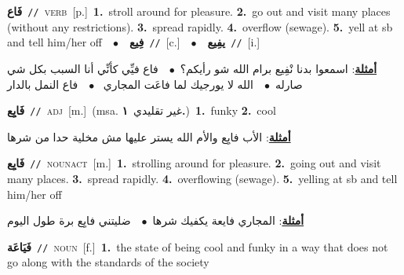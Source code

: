 \documentclass[10pt,a4paper,twoside]{article} %
\begin{document}
\begin{multicols}{2}
{\setlength\topsep{0pt}\textbf{\foreignlanguage{arabic}{فَاع}}\ {\color{gray}\texttt{//}\color{black}}\ \textsc{verb}\ [p.]\ \textbf{1.}~stroll around for pleasure.  \textbf{2.}~go out and visit many places (without any restrictions).  \textbf{3.}~spread rapidly.  \textbf{4.}~overflow (sewage).  \textbf{5.}~yell at sb and tell him/her off\ \ $\bullet$\ \ \setlength\topsep{0pt}\textbf{\foreignlanguage{arabic}{فِيع}}\ {\color{gray}\texttt{//}\color{black}}\ [c.]\ \ $\bullet$\ \ \setlength\topsep{0pt}\textbf{\foreignlanguage{arabic}{يفِيع}}\ {\color{gray}\texttt{//}\color{black}}\ [i.]\  \begin{flushright}\color{gray}\foreignlanguage{arabic}{\textbf{\underline{\foreignlanguage{arabic}{أمثلة}}}: اسمعوا بدنا نْفِيع برام الله شو رأيكم؟\ $\bullet$\ \  فاع فيِّي كأنِّي أنا السبب بكل شي صارله\ $\bullet$\ \  الله لا يورجيك لما فاعَت المجاري \ $\bullet$\ \  فاع النمل بالدار}\end{flushright}\color{black}} \vspace{2mm}

{\setlength\topsep{0pt}\textbf{\foreignlanguage{arabic}{فَايِع}}\ {\color{gray}\texttt{//}\color{black}}\ \textsc{adj}\ [m.]\ \color{gray}(msa. \foreignlanguage{arabic}{غير تقليدي}~\foreignlanguage{arabic}{\textbf{١.}})\color{black}\ \textbf{1.}~funky  \textbf{2.}~cool\  \begin{flushright}\color{gray}\foreignlanguage{arabic}{\textbf{\underline{\foreignlanguage{arabic}{أمثلة}}}: الأب فايِع والأم الله يستر عليها مش مخلية حدا من شرها}\end{flushright}\color{black}} \vspace{2mm}

{\setlength\topsep{0pt}\textbf{\foreignlanguage{arabic}{فَايِع}}\ {\color{gray}\texttt{//}\color{black}}\ \textsc{noun\textunderscore act}\ [m.]\ \textbf{1.}~strolling around for pleasure.  \textbf{2.}~going out and visit many places.  \textbf{3.}~spread rapidly.  \textbf{4.}~overflowing (sewage).  \textbf{5.}~yelling at sb and tell him/her off\  \begin{flushright}\color{gray}\foreignlanguage{arabic}{\textbf{\underline{\foreignlanguage{arabic}{أمثلة}}}: المجاري فايعة يكفيك شرها\ $\bullet$\ \  ضليتني فايِع برة طول اليوم}\end{flushright}\color{black}} \vspace{2mm}

{\setlength\topsep{0pt}\textbf{\foreignlanguage{arabic}{فَيَاعَة}}\ {\color{gray}\texttt{//}\color{black}}\ \textsc{noun}\ [f.]\ \textbf{1.}~the state of being cool and funky in a way that does not go along with the standards of the society\ } \vspace{2mm}


\end{multicols}
\end{document}
